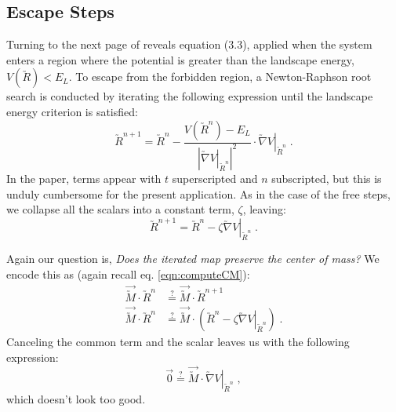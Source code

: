 \documentclass[letterpaper,12pt]{article}
\newcommand{\scmat}[1]{\vec{\utilde{#1}}}
\newcommand{\cvec}[1]{\utilde{#1}}
\newcommand{\svec}[1]{\vec{#1}}
\newcommand{\refeq}[1]{eq. \ref{eqn:#1}}
\newcommand{\laeq}[1]{\label{eqn:#1}}
\begin{document}
\subsection{Escape Steps} \label{sec:escapeSteps}
Turning to the next page of \cite{wang:2007:geodesics} reveals equation (3.3), applied when the system enters a region where the potential is greater than the landscape energy, $V(\cvec{R}) < E_L$. To escape from the forbidden region, a Newton-Raphson root search is conducted by iterating the following expression until the landscape energy criterion is satisfied:
\begin{equation}\laeq{computeEscapeStepVanilla}
\cvec{R}^{n+1} = \cvec{R}^{n} - \frac{V(\cvec{R}^{n})-E_L}{\left| \left. \cvec{\nabla}V\right|_{\cvec{R}^{n}} \right|^2} \cdot \left. \cvec{\nabla}V\right|_{\cvec{R}^{n}} \; .
\end{equation}
In the paper, terms appear with $t$ superscripted and $n$ subscripted, but this is unduly cumbersome for the present application. As in the case of the free steps, we collapse all the scalars into a constant term, $\zeta$, leaving:
\begin{equation}\laeq{computeEscapeStep}
\cvec{R}^{n+1} = \cvec{R}^{n} - \zeta \left. \cvec{\nabla}V\right|_{\cvec{R}^{n}} \; .
\end{equation}

Again our question is, \emph{Does the iterated map preserve the center of mass?} We encode this as (again recall \refeq{computeCM}):
\begin{equation}
\begin{aligned}
\scmat{M} \cdot \cvec{R}^{n} &\stackrel{?}{=} \scmat{M} \cdot \cvec{R}^{n+1} \\
\scmat{M} \cdot \cvec{R}^{n} &\stackrel{?}{=} \scmat{M} \cdot \left( \cvec{R}^{n} - \zeta \left. \cvec{\nabla}V\right|_{\cvec{R}^{n}} \right) \; .
\end{aligned}
\end{equation}
Canceling the common term and the scalar leaves us with the following expression:
\begin{equation} \laeq{yikes}
\svec{0} \stackrel{?}{=} \scmat{M} \cdot \left. \cvec{\nabla}V\right|_{\cvec{R}^{n}} \; ,
\end{equation}
which doesn't look too good. 
\end{document}
